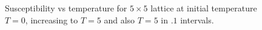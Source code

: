 \documentclass{article}
\begin{document}
\begin{figure}

\caption{Susceptibility vs temperature for $5 \times 5$ lattice at initial temperature $T = 0$,
increasing to $T = 5$ and also $T=5$ in $.1$ intervals.}
\end{figure}
\end{document}
